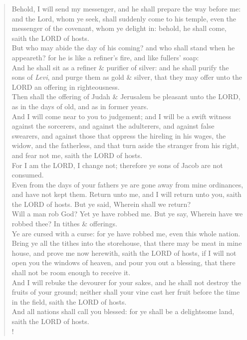 \documentclass[MAIN]{subfiles}
\begin{document}
\begin{verse}
Behold, I will send my messenger, and he shall prepare the way before me: and the Lord, whom ye seek, shall suddenly come to his temple, even the messenger of the covenant, whom ye delight in: behold, he shall come, saith the {\hge LORD} of hosts.\\
But who may abide the day of his coming? and who shall stand when he appeareth? for he is like a refiner's fire, and like fullers' soap:\\
And he shall sit as a refiner \& purifier of silver: and he shall purify the sons of \emph{Levi}, and purge them as gold \& silver, that they may offer unto the {\hge LORD} an offering in righteousness.\\
Then shall the offering of Judah \& {\sc Jerusalem} be pleasant unto the {\hge LORD}, as in the days of old, and as in former years.\\
And I will come near to you to judgement; and I will be a swift witness against the sorcerers, and against the adulterers, and against false swearers, and against those that oppress the hireling in his wages, the widow, and the fatherless, and that turn aside the stranger from his right, and fear not me, saith the {\hge LORD} of hosts.\\
For I am the {\hge LORD}, I change not; therefore ye sons of Jacob are not consumed.\\
Even from the days of your fathers ye are gone away from mine ordinances, and have not kept them. Return unto me, and I will return unto you, saith the {\hge LORD} of hosts. But ye said, Wherein shall we return?\\
Will a man rob God? Yet ye have robbed me. But ye say, Wherein have we robbed thee? In tithes \& offerings.\\
Ye are cursed with a curse: for ye have robbed me, even this whole nation.\\
Bring ye all the tithes into the storehouse, that there may be meat in mine house, and prove me now herewith, saith the {\hge LORD} of hosts, if I will not open you the windows of heaven, and pour you out a blessing, that there shall not be room enough to receive it.\\
And I will rebuke the devourer for your sakes, and he shall not destroy the fruits of your ground; neither shall your vine cast her fruit before the time in the field, saith the {\hge LORD} of hosts.\\
And all nations shall call you blessed: for ye shall be a delightsome land, saith the {\hge LORD} of hosts.\\!


\end{verse}
\end{document}
